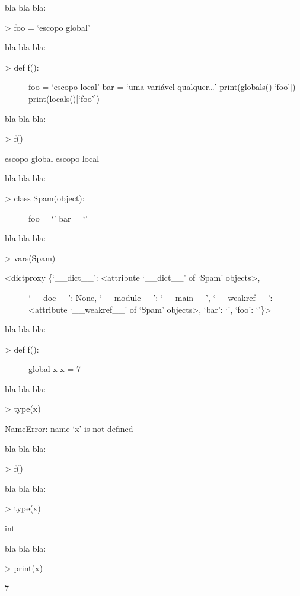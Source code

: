 \documentclass[letterpaper,10pt,brazil]{sphinxmanual}
\begin{document}
bla bla bla:

\textgreater{} foo = ‘escopo global’

bla bla bla:
\begin{description}
\item[{\textgreater{} def f():}] \leavevmode
foo = ‘escopo local’
bar = ‘uma variável qualquer…’
print(globals(){[}‘foo’{]})
print(locals(){[}‘foo’{]})

\end{description}

bla bla bla:

\textgreater{} f()

escopo global
escopo local

bla bla bla:
\begin{description}
\item[{\textgreater{} class Spam(object):}] \leavevmode
foo = ‘’
bar = ‘’

\end{description}

bla bla bla:

\textgreater{} vars(Spam)
\begin{description}
\item[{\textless{}dictproxy \{‘\_\_dict\_\_’: \textless{}attribute ‘\_\_dict\_\_’ of ‘Spam’ objects\textgreater{},}] \leavevmode
‘\_\_doc\_\_’: None,
‘\_\_module\_\_’: ‘\_\_main\_\_’,
‘\_\_weakref\_\_’: \textless{}attribute ‘\_\_weakref\_\_’ of ‘Spam’ objects\textgreater{},
‘bar’: ‘’,
‘foo’: ‘’\}\textgreater{}

\end{description}

bla bla bla:
\begin{description}
\item[{\textgreater{} def f():}] \leavevmode
global x
x = 7

\end{description}

bla bla bla:

\textgreater{} type(x)

NameError: name ‘x’ is not defined

bla bla bla:

\textgreater{} f()

bla bla bla:

\textgreater{} type(x)

int

bla bla bla:

\textgreater{} print(x)

7
\end{document}
